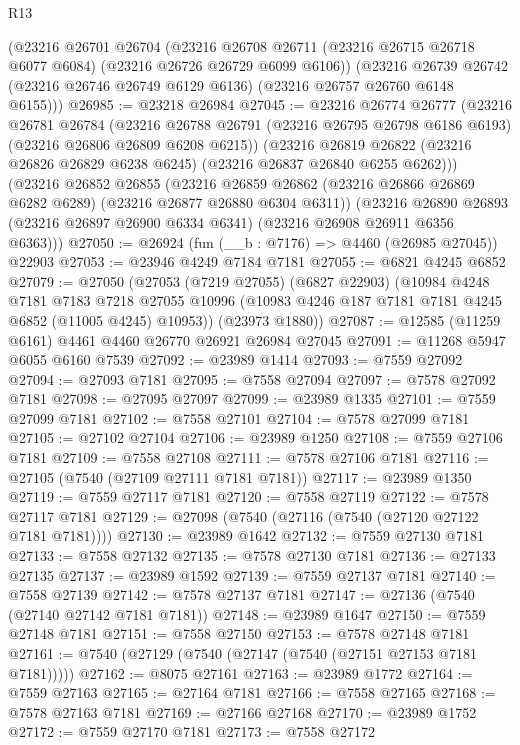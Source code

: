 \begin{lexlean}{R13}
\begin{coremodule}
    (@23216
      @26701
      @26704
      (@23216 @26708 @26711 (@23216 @26715 @26718 @6077 @6084) (@23216 @26726 @26729 @6099 @6106))
      (@23216 @26739 @26742 (@23216 @26746 @26749 @6129 @6136) (@23216 @26757 @26760 @6148 @6155)))
@26985 := @23218 @26984
@27045 := @23216
    @26774
    @26777
    (@23216
      @26781
      @26784
      (@23216 @26788 @26791 (@23216 @26795 @26798 @6186 @6193) (@23216 @26806 @26809 @6208 @6215))
      (@23216 @26819 @26822 (@23216 @26826 @26829 @6238 @6245) (@23216 @26837 @26840 @6255 @6262)))
    (@23216
      @26852
      @26855
      (@23216 @26859 @26862 (@23216 @26866 @26869 @6282 @6289) (@23216 @26877 @26880 @6304 @6311))
      (@23216 @26890 @26893 (@23216 @26897 @26900 @6334 @6341) (@23216 @26908 @26911 @6356 @6363)))
@27050 := @26924 (fun (__b : @7176) => @4460 (@26985 @27045)) @22903
@27053 := @23946 @4249 @7184 @7181
@27055 := @6821 @4245 @6852
@27079 := @27050
    (@27053
      (@7219 @27055)
      (@6827 @22903)
      (@10984
        @4248
        @7181
        @7183
        @7218
        @27055
        @10996
        (@10983 @4246 @187 @7181 @7181 @4245 @6852 (@11005 @4245) @10953))
      (@23973 @1880))
@27087 := @12585 (@11259 @6161) @4461 @4460 @26770 @26921 @26984 @27045
@27091 := @11268 @5947 @6055 @6160 @7539
@27092 := @23989 @1414
@27093 := @7559 @27092
@27094 := @27093 @7181
@27095 := @7558 @27094
@27097 := @7578 @27092 @7181
@27098 := @27095 @27097
@27099 := @23989 @1335
@27101 := @7559 @27099 @7181
@27102 := @7558 @27101
@27104 := @7578 @27099 @7181
@27105 := @27102 @27104
@27106 := @23989 @1250
@27108 := @7559 @27106 @7181
@27109 := @7558 @27108
@27111 := @7578 @27106 @7181
@27116 := @27105 (@7540 (@27109 @27111 @7181 @7181))
@27117 := @23989 @1350
@27119 := @7559 @27117 @7181
@27120 := @7558 @27119
@27122 := @7578 @27117 @7181
@27129 := @27098 (@7540 (@27116 (@7540 (@27120 @27122 @7181 @7181))))
@27130 := @23989 @1642
@27132 := @7559 @27130 @7181
@27133 := @7558 @27132
@27135 := @7578 @27130 @7181
@27136 := @27133 @27135
@27137 := @23989 @1592
@27139 := @7559 @27137 @7181
@27140 := @7558 @27139
@27142 := @7578 @27137 @7181
@27147 := @27136 (@7540 (@27140 @27142 @7181 @7181))
@27148 := @23989 @1647
@27150 := @7559 @27148 @7181
@27151 := @7558 @27150
@27153 := @7578 @27148 @7181
@27161 := @7540 (@27129 (@7540 (@27147 (@7540 (@27151 @27153 @7181 @7181)))))
@27162 := @8075 @27161
@27163 := @23989 @1772
@27164 := @7559 @27163
@27165 := @27164 @7181
@27166 := @7558 @27165
@27168 := @7578 @27163 @7181
@27169 := @27166 @27168
@27170 := @23989 @1752
@27172 := @7559 @27170 @7181
@27173 := @7558 @27172

\end{coremodule}
\end{lexlean}
